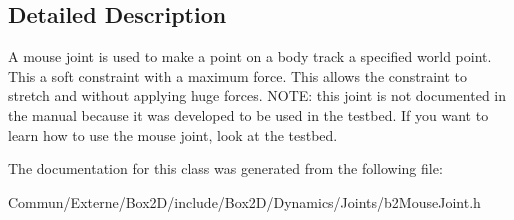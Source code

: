 \subsection{Detailed Description}
A mouse joint is used to make a point on a body track a specified world point. This a soft constraint with a maximum force. This allows the constraint to stretch and without applying huge forces. N\+O\+TE\+: this joint is not documented in the manual because it was developed to be used in the testbed. If you want to learn how to use the mouse joint, look at the testbed. 

The documentation for this class was generated from the following file\+:\begin{DoxyCompactItemize}
\item 
Commun/\+Externe/\+Box2\+D/include/\+Box2\+D/\+Dynamics/\+Joints/b2\+Mouse\+Joint.\+h\end{DoxyCompactItemize}
